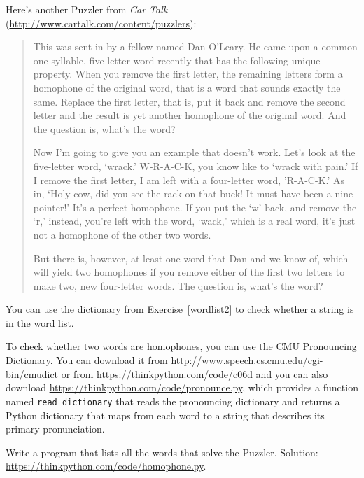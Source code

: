 \documentclass[10pt]{book}
\begin{document}
\begin{exercise}

Here's another Puzzler from {\em Car Talk}
(\url{http://www.cartalk.com/content/puzzlers}):

\begin{quote}
This was sent in by a fellow named Dan O'Leary. He came upon a common
one-syllable, five-letter word recently that has the following unique
property. When you remove the first letter, the remaining letters form
a homophone of the original word, that is a word that sounds exactly
the same. Replace the first letter, that is, put it back and remove
the second letter and the result is yet another homophone of the
original word. And the question is, what's the word?

Now I'm going to give you an example that doesn't work. Let's look at
the five-letter word, `wrack.' W-R-A-C-K, you know like to `wrack with
pain.' If I remove the first letter, I am left with a four-letter
word, 'R-A-C-K.' As in, `Holy cow, did you see the rack on that buck!
It must have been a nine-pointer!' It's a perfect homophone. If you
put the `w' back, and remove the `r,' instead, you're left with the
word, `wack,' which is a real word, it's just not a homophone of the
other two words.

But there is, however, at least one word that Dan and we know of,
which will yield two homophones if you remove either of the first two
letters to make two, new four-letter words. The question is, what's
the word?
\end{quote}

You can use the dictionary from Exercise~\ref{wordlist2} to check
whether a string is in the word list.

To check whether two words are homophones, you can use the CMU
Pronouncing Dictionary.  You can download it from
\url{http://www.speech.cs.cmu.edu/cgi-bin/cmudict} or from
\url{https://thinkpython.com/code/c06d} and you can also download
\url{https://thinkpython.com/code/pronounce.py}, which provides a function
named \verb"read_dictionary" that reads the pronouncing dictionary and
returns a Python dictionary that maps from each word to a string that
describes its primary pronunciation.

Write a program that lists all the words that solve the Puzzler.
Solution: \url{https://thinkpython.com/code/homophone.py}.

\end{exercise}
\end{document}
